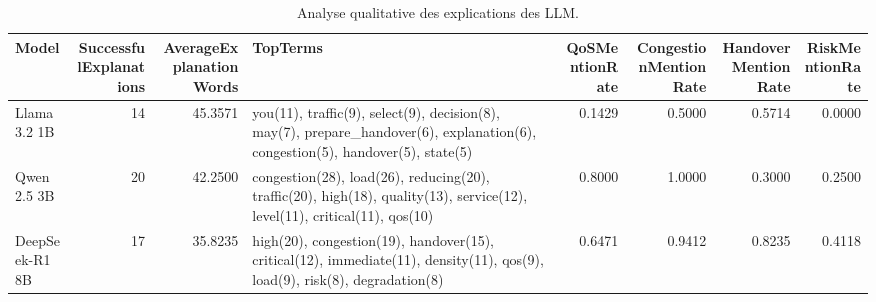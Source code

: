 \begin{table}[!htbp]
\caption{Analyse qualitative des explications des LLM.}
\label{tab:external_qualitative_explanations}
\begin{tabular}{lrrlrrrr}
\toprule
Model & SuccessfulExplanations & AverageExplanationWords & TopTerms & QoSMentionRate & CongestionMentionRate & HandoverMentionRate & RiskMentionRate \\
\midrule
Llama 3.2 1B & 14 & 45.3571 & you(11), traffic(9), select(9), decision(8), may(7), prepare\_handover(6), explanation(6), congestion(5), handover(5), state(5) & 0.1429 & 0.5000 & 0.5714 & 0.0000 \\
Qwen 2.5 3B & 20 & 42.2500 & congestion(28), load(26), reducing(20), traffic(20), high(18), quality(13), service(12), level(11), critical(11), qos(10) & 0.8000 & 1.0000 & 0.3000 & 0.2500 \\
DeepSeek-R1 8B & 17 & 35.8235 & high(20), congestion(19), handover(15), critical(12), immediate(11), density(11), qos(9), load(9), risk(8), degradation(8) & 0.6471 & 0.9412 & 0.8235 & 0.4118 \\
\bottomrule
\end{tabular}
\end{table}
